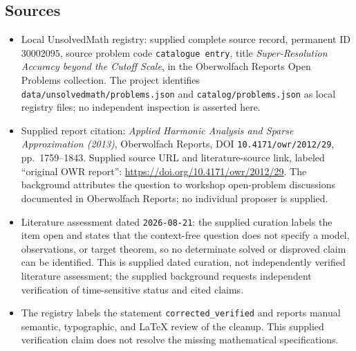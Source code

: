 \documentclass[11pt]{article}
\begin{document}
\subsection{Sources}
\begin{itemize}
\item Local UnsolvedMath registry: supplied complete source record, permanent ID \(30002095\), source problem code \texttt{catalogue entry}, title \emph{Super-Resolution Accuracy beyond the Cutoff Scale}, in the Oberwolfach Reports Open Problems collection. The project identifies \texttt{data/unsolvedmath/problems.json} and \texttt{catalog/problems.json} as local registry files; no independent inspection is asserted here.
\item Supplied report citation: \emph{Applied Harmonic Analysis and Sparse Approximation (2013)}, Oberwolfach Reports, DOI \texttt{10.4171/owr/2012/29}, pp.\ 1759--1843. Supplied source URL and literature-source link, labeled ``original OWR report'': \url{https://doi.org/10.4171/owr/2012/29}. The background attributes the question to workshop open-problem discussions documented in Oberwolfach Reports; no individual proposer is supplied.
\item Literature assessment dated \texttt{2026-08-21}: the supplied curation labels the item open and states that the context-free question does not specify a model, observations, or target theorem, so no determinate solved or disproved claim can be identified. This is supplied dated curation, not independently verified literature assessment; the supplied background requests independent verification of time-sensitive status and cited claims.
\item The registry labels the statement \texttt{corrected\_verified} and reports manual semantic, typographic, and LaTeX review of the cleanup. This supplied verification claim does not resolve the missing mathematical specifications.
\end{itemize}
\end{document}
